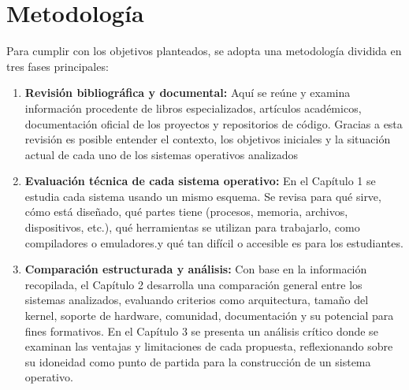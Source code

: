 \section*{Metodología}

Para cumplir con los objetivos planteados, se adopta una metodología dividida en tres fases principales:

\begin{enumerate}
\item \textbf{Revisión bibliográfica y documental:} Aquí se reúne y examina información procedente de libros especializados, artículos académicos, documentación oficial de los proyectos y repositorios de código. Gracias a esta revisión es posible entender el contexto, los objetivos iniciales y la situación actual de cada uno de los sistemas operativos analizados

\item \textbf{Evaluación técnica de cada sistema operativo:} En el Capítulo 1 se estudia cada sistema usando un mismo esquema. Se revisa para qué sirve, cómo está diseñado, qué partes tiene (procesos, memoria, archivos, dispositivos, etc.), qué herramientas se utilizan para trabajarlo, como compiladores o emuladores.y qué tan difícil o accesible es para los estudiantes.

\item \textbf{Comparación estructurada y análisis:} Con base en la información recopilada, el Capítulo 2 desarrolla una comparación general entre los sistemas analizados, evaluando criterios como arquitectura, tamaño del kernel, soporte de hardware, comunidad, documentación y su potencial para fines formativos. En el Capítulo 3 se presenta un análisis crítico donde se examinan las ventajas y limitaciones  de cada propuesta, reflexionando sobre su idoneidad como punto de partida para la construcción de un sistema operativo.
\end{enumerate}